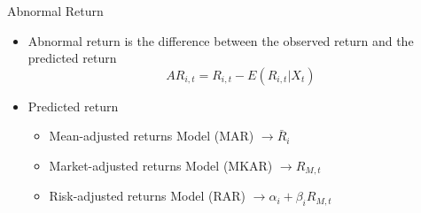 \documentclass{beamer}
\begin{document}
	\begin{frame}{Abnormal Return}
		\begin{itemize}
			\item Abnormal return  is the difference between the observed return and the predicted return
			\begin{equation*}
				AR_{i,t} = R_{i,t} - E(R_{i,t}|X_t)
			\end{equation*}
			\item Predicted return
			\begin{itemize}
				\item Mean-adjusted returns Model (MAR) $ \longrightarrow \bar{R}_i $
				\item Market-adjusted returns Model (MKAR) $ \longrightarrow {R}_{M,t} $
				\item Risk-adjusted returns Model (RAR) $ \longrightarrow \alpha_i + \beta_i{R}_{M,t} $
			\end{itemize}
		\end{itemize}
	\end{frame}
\end{document}

